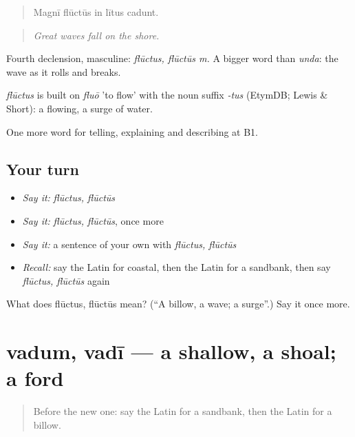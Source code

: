 \begin{quote}
Magnī flūctūs in lītus cadunt.
\end{quote}

\begin{quote}
\emph{Great waves fall on the shore.}
\end{quote}

Fourth declension, masculine: \emph{flūctus, flūctūs m.} A bigger word than \emph{unda}: the wave as it rolls and breaks.

\begin{cousinweb}
\emph{flūctus} is built on \emph{fluō} 'to flow' with the noun suffix \emph{-tus} (EtymDB; Lewis \& Short): a flowing, a surge of water.
\end{cousinweb}

\begin{grammarlens}[title={What you've built}]
One more word for telling, explaining and describing at B1.
\end{grammarlens}

\subsection*{Your turn}
\begin{itemize}
\raggedright
  \item \emph{Say it:} \emph{flūctus, flūctūs}
  \item \emph{Say it:} \emph{flūctus, flūctūs}, once more
  \item \emph{Say it:} a sentence of your own with \emph{flūctus, flūctūs}
  \item \emph{Recall:} say the Latin for coastal, then the Latin for a sandbank, then say \emph{flūctus, flūctūs} again
\end{itemize}

\begin{tcolorbox}[breakable,colback=teal!4,colframe=teal!35!black,title={Before you move on}]
What does flūctus, flūctūs mean? (\textquotedblleft{}A billow, a wave; a surge\textquotedblright{}.) Say it once more.
\end{tcolorbox}
\section[vadum, vadī]{vadum, vadī — a shallow, a shoal; a ford}

\label{lesson:LA-C443-vadum}



\begin{quote}
Before the new one: say the Latin for a sandbank, then the Latin for a billow.
\end{quote}

